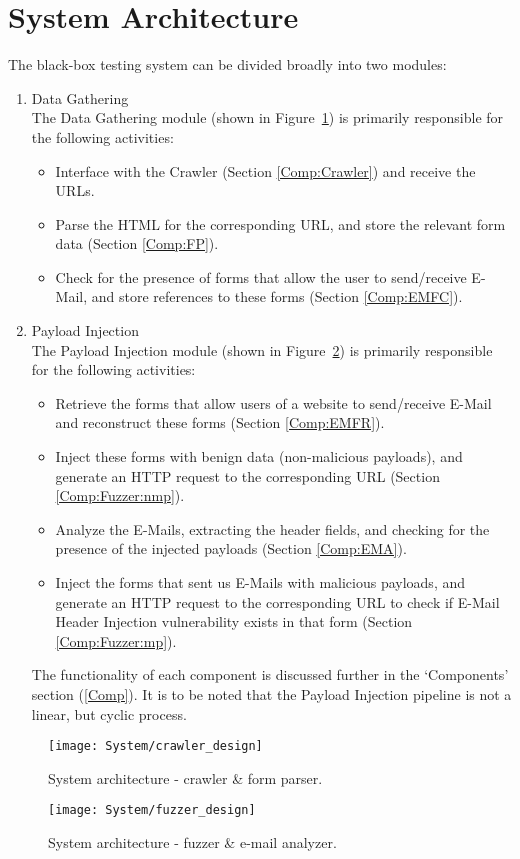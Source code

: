 \section{System Architecture}
\label{sys:arch}
The black-box testing system can be divided broadly into two modules:
\begin{enumerate}
	\item Data Gathering\\
	The Data Gathering module (shown in Figure~\ref{fig:crawler}) is primarily responsible for the following activities:
	\begin{itemize}
		\item Interface with the Crawler (Section \ref{Comp:Crawler}) and receive the URLs.
		\item Parse the HTML for the corresponding URL, and store the relevant form data (Section \ref{Comp:FP}).
		\item Check for the presence of forms that allow the user to send/receive E-Mail, and store references to these forms (Section \ref{Comp:EMFC}).
	\end{itemize} 
	\item Payload Injection\\
	The Payload Injection module (shown in Figure~\ref{fig:fuzzer}) is primarily responsible for the following activities:
	\begin{itemize}
		\item Retrieve the forms that allow users of a website to send/receive E-Mail and reconstruct these forms (Section \ref{Comp:EMFR}).
		\item Inject these forms with benign data (non-malicious payloads), and generate an HTTP request to the corresponding URL (Section \ref{Comp:Fuzzer:nmp}).
		\item Analyze the E-Mails, extracting the header fields, and checking for the presence of the injected payloads (Section \ref{Comp:EMA}).
		\item Inject the forms that sent us E-Mails with malicious payloads, and generate an HTTP request to the corresponding URL to check if E-Mail Header Injection vulnerability exists in that form (Section \ref{Comp:Fuzzer:mp}).
	\end{itemize} 
	The functionality of each component is discussed further in the `Components' section (\ref{Comp}). It is to be noted that the Payload Injection pipeline is not a linear, but cyclic process.
\end{enumerate}

\begin{figure}
	\centering
	\texttt{[image: System/crawler\_design]}
	\caption[]{System architecture - crawler \& form parser.}
	\label{fig:crawler}
\end{figure}


\begin{figure}
	\centering
	\texttt{[image: System/fuzzer\_design]}
	\caption[]{System architecture - fuzzer {\&} e-mail analyzer.}
	\label{fig:fuzzer}
\end{figure}
